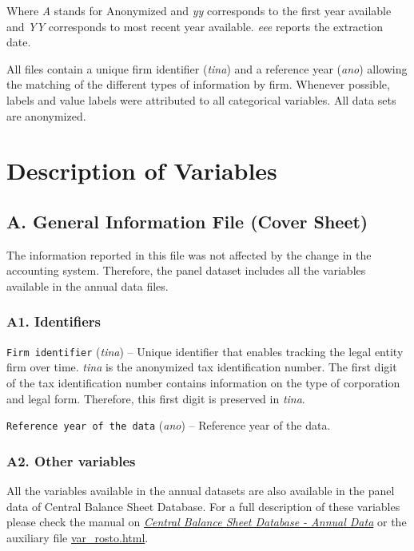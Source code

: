 \documentclass[]{book}
\begin{document}
Where \emph{A} stands for Anonymized and \emph{yy} corresponds to the first year available and \emph{YY} corresponds to most recent year available. \emph{eee} reports the extraction date.

All files contain a unique firm identifier (\emph{tina}) and a reference year (\emph{ano}) allowing the matching of the different types of information by firm. Whenever possible, labels and value labels were attributed to all categorical variables. All data sets are anonymized.

\hypertarget{description-of-variables}{%
\chapter{Description of Variables}\label{description-of-variables}}

\hypertarget{a.-general-information-file-cover-sheet}{%
\section{A. General Information File (Cover Sheet)}\label{a.-general-information-file-cover-sheet}}

The information reported in this file was not affected by the change in the accounting system. Therefore, the panel dataset includes all the variables available in the annual data files.

\hypertarget{a1.-identifiers}{%
\subsection{A1. Identifiers}\label{a1.-identifiers}}

\texttt{Firm\ identifier} (\emph{tina}) -- Unique identifier that enables tracking the legal entity firm over time. \emph{tina} is the anonymized tax identification number. The first digit of the tax identification number contains information on the type of corporation and legal form. Therefore, this first digit is preserved in \emph{tina}.

\texttt{Reference\ year\ of\ the\ data} (\emph{ano}) -- Reference year of the data.

\hypertarget{a2.-other-variables}{%
\subsection{A2. Other variables}\label{a2.-other-variables}}

All the variables available in the annual datasets are also available in the panel data of Central Balance Sheet Database. For a full description of these variables please check the manual on \href{../../CB/Jun2018/Pack_CB_Empresas_Jun18/manual_CB_Jun2018.html}{\emph{Central Balance Sheet Database - Annual Data}} or the auxiliary file \href{./Auxiliary\%20Files/variables_description/var_rosto.html}{var\_rosto.html}.
\end{document}
